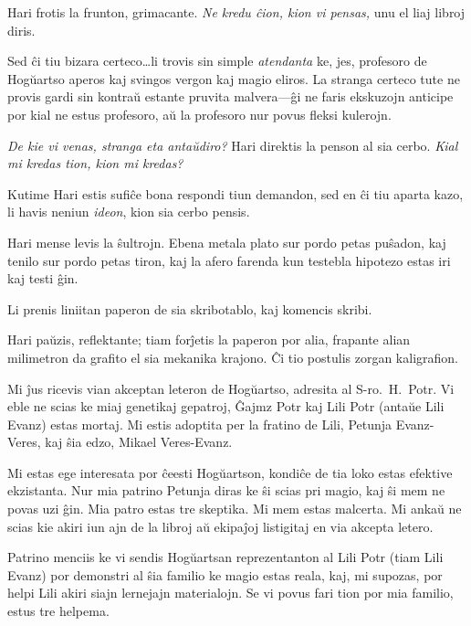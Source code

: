 Hari frotis la frunton, grimacante.
\emph{Ne kredu ĉion, kion vi pensas,} unu el liaj libroj diris.

Sed ĉi tiu bizara certeco…li trovis sin simple \emph{atendanta} ke, jes, profesoro de Hogŭartso aperos kaj svingos vergon kaj magio eliros.
La stranga certeco tute ne provis gardi sin kontraŭ estante pruvita malvera—ĝi ne faris ekskuzojn anticipe por kial ne estus profesoro, aŭ la profesoro nur povus fleksi kulerojn.

\emph{De kie vi venas, stranga eta antaŭdiro?}
Hari direktis la penson al sia cerbo.
\emph{Kial mi kredas tion, kion mi kredas?}

Kutime Hari estis sufiĉe bona respondi tiun demandon, sed en ĉi tiu aparta kazo, li havis neniun \emph{ideon}, kion sia cerbo pensis.

Hari mense levis la ŝultrojn.
Ebena metala plato sur pordo petas puŝadon, kaj tenilo sur pordo petas tiron, kaj la afero farenda kun testebla hipotezo estas iri kaj testi ĝin.

Li prenis liniitan paperon de sia skribotablo, kaj komencis skribi.

\begin{writtenNote}
\end{writtenNote}

Hari paŭzis, reflektante; tiam forĵetis la paperon por alia, frapante alian milimetron da grafito el sia mekanika krajono.
Ĉi tio postulis zorgan kaligrafion.

\begin{writtenNote}


Mi ĵus ricevis vian akceptan leteron de Hogŭartso, adresita al S\nobreakdash-ro.~H.~Potr.
Vi eble ne scias ke miaj genetikaj gepatroj, Ĝajmz Potr kaj Lili Potr (antaŭe Lili Evanz) estas mortaj.
Mi estis adoptita per la fratino de Lili, Petunja Evanz-Veres, kaj ŝia edzo, Mikael Veres-Evanz.

Mi estas ege interesata por ĉeesti Hogŭartson, kondiĉe de tia loko estas efektive ekzistanta.
Nur mia patrino Petunja diras ke ŝi scias pri magio, kaj ŝi mem ne povas uzi ĝin.
Mia patro estas tre skeptika.
Mi mem estas malcerta.
Mi ankaŭ ne scias kie akiri iun ajn de la libroj aŭ ekipaĵoj listigitaj en via akcepta letero.

Patrino menciis ke vi sendis Hogŭartsan reprezentanton al Lili Potr (tiam Lili Evanz) por demonstri al ŝia familio ke magio estas reala, kaj, mi supozas, por helpi Lili akiri siajn lernejajn materialojn.
Se vi povus fari tion por mia familio, estus tre helpema.

\end{writtenNote}

